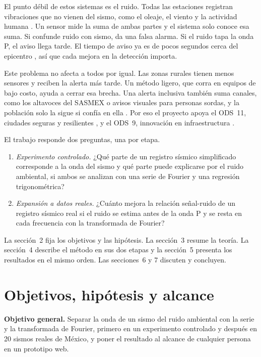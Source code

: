 \documentclass[11pt,letterpaper]{article}
\begin{document}
El punto débil de estos sistemas es el ruido. Todas las estaciones registran vibraciones que no vienen del sismo, como el oleaje, el viento y la actividad humana \parencite{peterson1993,mcnamara2004}. Un sensor mide la suma de ambas partes y el sistema solo conoce esa suma. Si confunde ruido con sismo, da una falsa alarma. Si el ruido tapa la onda P, el aviso llega tarde. El tiempo de aviso ya es de pocos segundos cerca del epicentro \parencite{minson2018}, así que cada mejora en la detección importa.

Este problema no afecta a todos por igual. Las zonas rurales tienen menos sensores y reciben la alerta más tarde. Un método ligero, que corra en equipos de bajo costo, ayuda a cerrar esa brecha. Una alerta inclusiva también suma canales, como los altavoces del SASMEX \parencite{sasmex} o avisos visuales para personas sordas, y la población solo la sigue si confía en ella \parencite{allen2018eos}. Por eso el proyecto apoya el ODS~11, ciudades seguras y resilientes \parencite{onu11}, y el ODS~9, innovación en infraestructura \parencite{onu9}.

El trabajo responde dos preguntas, una por etapa.
\begin{enumerate}
\item \textit{Experimento controlado.} ¿Qué parte de un registro sísmico simplificado corresponde a la onda del sismo y qué parte puede explicarse por el ruido ambiental, si ambos se analizan con una serie de Fourier y una regresión trigonométrica?
\item \textit{Expansión a datos reales.} ¿Cuánto mejora la relación señal-ruido de un registro sísmico real si el ruido se estima antes de la onda P y se resta en cada frecuencia con la transformada de Fourier?
\end{enumerate}
La sección~2 fija los objetivos y las hipótesis. La sección~3 resume la teoría. La sección~4 describe el método en sus dos etapas y la sección~5 presenta los resultados en el mismo orden. Las secciones~6 y 7 discuten y concluyen.

\section{Objetivos, hipótesis y alcance}
\textbf{Objetivo general.} Separar la onda de un sismo del ruido ambiental con la serie y la transformada de Fourier, primero en un experimento controlado y después en 20 sismos reales de México, y poner el resultado al alcance de cualquier persona en un prototipo web.
\end{document}

